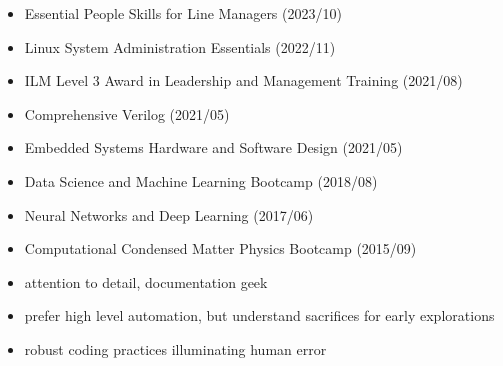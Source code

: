 \documentclass[10pt,a4paper,ragged2e,withhyper]{altacv}
\begin{document}
\begin{paracol}{2}
\begin{itemize}
    
    
    \item Essential People Skills for Line Managers (2023/10)

    \item Linux System Administration Essentials (2022/11)
    
    \item ILM Level 3 Award in Leadership and Management Training (2021/08)
    
    \item Comprehensive Verilog (2021/05)
    
    \item Embedded Systems Hardware and Software Design (2021/05)
    
    \item Data Science and Machine Learning Bootcamp (2018/08)
    
    \item Neural Networks and Deep Learning (2017/06)
    
    \item Computational Condensed Matter Physics Bootcamp (2015/09)
    
\end{itemize}




\begin{itemize}
    \item 
    attention to detail, documentation geek
    
    \item 
    prefer high level automation, but understand sacrifices for early explorations
    
    \item 
    robust coding practices illuminating human error
    

\end{itemize}
\end{paracol}
\end{document}
